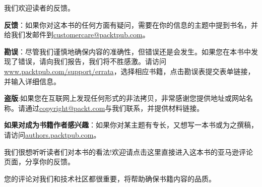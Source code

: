 
我们欢迎读者的反馈。

\textbf{反馈}：如果你对这本书的任何方面有疑问，需要在你的信息的主题中提到书名，并给我们发邮件到\url{customercare@packtpub.com}。

\textbf{勘误}：尽管我们谨慎地确保内容的准确性，但错误还是会发生。如果您在本书中发现了错误，请向我们报告，我们将不胜感激。请访问\url{www.packtpub.com/support/errata}，选择相应书籍，点击勘误表提交表单链接，并输入详细信息。

\textbf{盗版}:如果您在互联网上发现任何形式的非法拷贝，非常感谢您提供地址或网站名称。请通过\url{copyright@packt.com}与我们联系，并提供材料链接。

\textbf{如果对成为书籍作者感兴趣}：如果你对某主题有专长，又想写一本书或为之撰稿，请访问\url{authors.packtpub.com}。



我们很想听听读者们对本书的看法!欢迎请点击这里直接进入这本书的亚马逊评论页面，分享你的反馈。

您的评论对我们和技术社区都很重要，将帮助确保书籍内容的品质。

